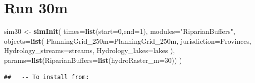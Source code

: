 \documentclass[
]{article}
\newenvironment{Shaded}{\begin{snugshade}}{\end{snugshade}}
\newcommand{\AttributeTok}[1]{\textcolor[rgb]{0.13,0.29,0.53}{#1}}
\newcommand{\DecValTok}[1]{\textcolor[rgb]{0.00,0.00,0.81}{#1}}
\newcommand{\FunctionTok}[1]{\textcolor[rgb]{0.13,0.29,0.53}{\textbf{#1}}}
\newcommand{\NormalTok}[1]{#1}
\newcommand{\OtherTok}[1]{\textcolor[rgb]{0.56,0.35,0.01}{#1}}
\newcommand{\SpecialCharTok}[1]{\textcolor[rgb]{0.81,0.36,0.00}{\textbf{#1}}}
\newcommand{\StringTok}[1]{\textcolor[rgb]{0.31,0.60,0.02}{#1}}
\begin{document}
\begin{Shaded}
\end{Shaded}

\section{Run 30m}\label{run-30m}

\begin{Shaded}
\begin{Highlighting}[]
\NormalTok{sim30 }\OtherTok{\textless{}{-}} \FunctionTok{simInit}\NormalTok{(}
  \AttributeTok{times=}\FunctionTok{list}\NormalTok{(}\AttributeTok{start=}\DecValTok{0}\NormalTok{,}\AttributeTok{end=}\DecValTok{1}\NormalTok{),}
  \AttributeTok{modules=}\StringTok{"RiparianBuffers"}\NormalTok{,}
  \AttributeTok{objects=}\FunctionTok{list}\NormalTok{(}
    \AttributeTok{PlanningGrid\_250m=}\NormalTok{PlanningGrid\_250m,}
    \AttributeTok{jurisdiction=}\NormalTok{Provinces,}
    \AttributeTok{Hydrology\_streams=}\NormalTok{streams,}
    \AttributeTok{Hydrology\_lakes=}\NormalTok{lakes}
\NormalTok{  ),}
  \AttributeTok{params=}\FunctionTok{list}\NormalTok{(}\AttributeTok{RiparianBuffers=}\FunctionTok{list}\NormalTok{(}\AttributeTok{hydroRaster\_m=}\DecValTok{30}\NormalTok{))}
\NormalTok{)}
\end{Highlighting}
\end{Shaded}

\begin{verbatim}
##   -- To install from:
\end{verbatim}
\end{document}
